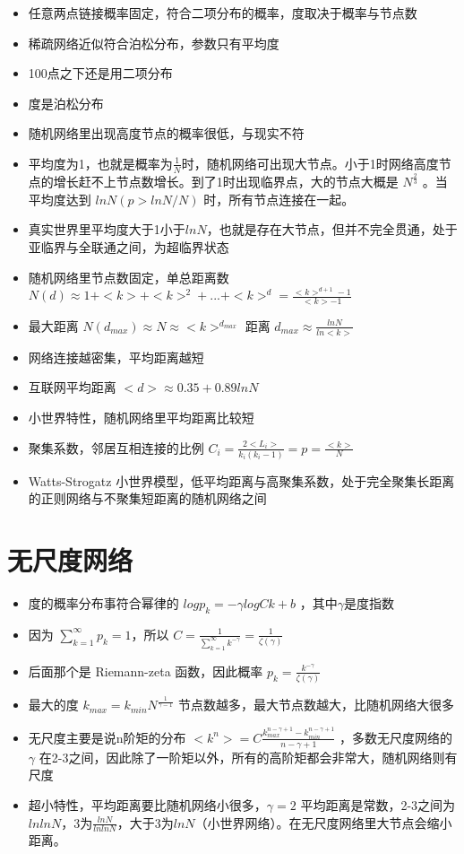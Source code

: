 \documentclass[
]{book}
\providecommand{\tightlist}{%
  \setlength{\itemsep}{0pt}\setlength{\parskip}{0pt}}
\begin{document}
\begin{itemize}
\tightlist
\item
  任意两点链接概率固定，符合二项分布的概率，度取决于概率与节点数
\item
  稀疏网络近似符合泊松分布，参数只有平均度
\item
  100点之下还是用二项分布
\item
  度是泊松分布
\item
  随机网络里出现高度节点的概率很低，与现实不符
\item
  平均度为1，也就是概率为\(\frac{1}{N}\)时，随机网络可出现大节点。小于1时网络高度节点的增长赶不上节点数增长。到了1时出现临界点，大的节点大概是 \(N^{\frac{2}{3}}\) 。当平均度达到 \(lnN(p>lnN/N)\) 时，所有节点连接在一起。
\item
  真实世界里平均度大于1小于\(lnN\)，也就是存在大节点，但并不完全贯通，处于亚临界与全联通之间，为超临界状态
\item
  随机网络里节点数固定，单总距离数 \(N(d)\approx 1+<k>+<k>^2+...+<k>^d = \frac{<k>^{d+1}-1}{<k>-1}\)
\item
  最大距离 \(N(d_{max})\approx N \approx <k>^{d_{max}}\) 距离 \(d_{max} \approx\frac{lnN}{ln<k>}\)
\item
  网络连接越密集，平均距离越短
\item
  互联网平均距离 \(<d> \approx 0.35+0.89lnN\)
\item
  小世界特性，随机网络里平均距离比较短
\item
  聚集系数，邻居互相连接的比例 \(C_i = \frac{2<L_i>}{k_i(k_i-1)} = p = \frac{<k>}{N}\)
\item
  Watts-Strogatz 小世界模型，低平均距离与高聚集系数，处于完全聚集长距离的正则网络与不聚集短距离的随机网络之间
\end{itemize}

\hypertarget{ux65e0ux5c3aux5ea6ux7f51ux7edc}{%
\section{无尺度网络}\label{ux65e0ux5c3aux5ea6ux7f51ux7edc}}

\begin{itemize}
\tightlist
\item
  度的概率分布事符合幂律的 \(log p_k = -\gamma logCk+b\) ，其中\(\gamma\)是度指数
\item
  因为 \(\sum_{k=1}^\infty p_k = 1\)，所以 \(C = \frac{1}{\sum_{k=1}^{\infty}k^{-\gamma}} = \frac{1}{\zeta(\gamma)}\)
\item
  后面那个是 Riemann-zeta 函数，因此概率 \(p_k = \frac{k^{-\gamma}}{\zeta(\gamma)}\)
\item
  最大的度 \(k_{max} = k_{min}N^{\frac{1}{\gamma -1}}\) 节点数越多，最大节点数越大，比随机网络大很多
\item
  无尺度主要是说n阶矩的分布 \(<k^n> = C\frac{k_{max}^{n-\gamma+1} - k_{min}^{n-\gamma+1}}{n-\gamma+1}\) ，多数无尺度网络的 \(\gamma\) 在2-3之间，因此除了一阶矩以外，所有的高阶矩都会非常大，随机网络则有尺度
\item
  超小特性，平均距离要比随机网络小很多，\(\gamma =2\) 平均距离是常数，2-3之间为\(lnlnN\)，3为\(\frac{lnN}{lnlnN}\)，大于3为\(lnN\)（小世界网络）。在无尺度网络里大节点会缩小距离。
\end{itemize}
\end{document}
